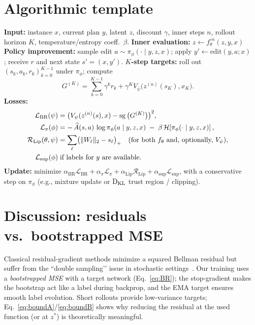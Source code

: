 \documentclass[11pt]{article}
\begin{document}
\section{Algorithmic template}
\begin{algorithm}[H]
\caption{Unrolled Policy Iteration for TRM (single interaction step)}
\label{alg:upi}
\begin{algorithmic}[1]
\State \textbf{Input:} instance $x$, current plan $y$, latent $z$, discount $\gamma$, inner steps $n$, rollout horizon $K$, temperature/entropy coeff.\ $\beta$.
\State \textbf{Inner evaluation:} $z \leftarrow f_\theta^{\circ n}(z,y,x)$ 
\State \textbf{Policy improvement:} sample edit $a\sim\pi_\phi(\cdot\mid y,z,x)$; apply $y'\leftarrow \mathrm{edit}(y,a;x)$; receive $r$ and next state $s'=(x,y')$.
\State \textbf{$K$-step targets:} roll out $(s_k,a_k,r_k)_{k=0}^{K-1}$ under $\pi_\phi$; compute
\[
G^{(K)}=\sum_{k=0}^{K-1}\gamma^k r_k+\gamma^K V_{\bar\psi}\!\bigl(z^{(n)}(s_K),x_K\bigr).
\]
\State \textbf{Losses:}
\begin{align*}
\mathcal{L}_{\mathrm{BR}}(\psi) &= \bigl(V_\psi(z^{(n)}(s),x)-\operatorname{sg}\big(G^{(K)}\big)\bigr)^2,\\
\mathcal{L}_{\pi}(\phi) &= -\,\widehat{A}(s,a)\,\log \pi_\phi(a\mid y,z,x)\;-\;\beta\,\mathcal{H}\!\left[\pi_\phi(\cdot\mid y,z,x)\right],\\
\mathcal{R}_{\mathrm{Lip}}(\theta,\psi) &= \sum_{\ell}\bigl(\|W_\ell\|_2 - s_\ell\bigr)_+ \quad\text{(for both $f_\theta$ and, optionally, $V_\psi$)},\\
\mathcal{L}_{\mathrm{sup}}(\phi) &\;\text{if labels for } y \text{ are available.}
\end{align*}
\State \textbf{Update:} minimize $\alpha_{\mathrm{BR}}\mathcal{L}_{\mathrm{BR}}+\alpha_{\pi}\mathcal{L}_{\pi}+\alpha_{\mathrm{Lip}}\mathcal{R}_{\mathrm{Lip}}+\alpha_{\mathrm{sup}}\mathcal{L}_{\mathrm{sup}}$, with a conservative step on $\pi_\phi$ (e.g., mixture update or $\mathrm{D}_{\mathrm{KL}}$ trust region / clipping).
\end{algorithmic}
\end{algorithm}

\section{Discussion: residuals vs.\ bootstrapped MSE}
Classical residual-gradient methods minimize a squared Bellman residual but suffer from the “double sampling’’ issue in stochastic settings~\citep{Baird1995Residual,SuttonBarto2018}.
Our training uses a \emph{bootstrapped MSE} with a target network (Eq.~\eqref{eq:BR}); the stop-gradient makes the bootstrap act like a label during backprop, and the EMA target ensures smooth label evolution. Short rollouts provide low-variance targets; Eq.~\eqref{eq:boundA}/\eqref{eq:boundB} shows why reducing the residual at the used function (or at $z^*$) is theoretically meaningful.
\end{document}
